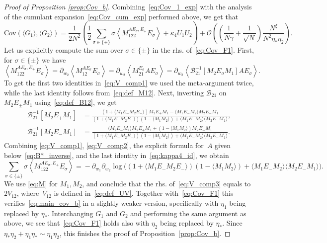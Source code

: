 \documentclass[10pt]{amsart}
\numberwithin{equation}{section}
\newcommand{\Cov}{\mathrm{Cov}}
\begin{document}
\begin{proof}[Proof of Proposition \ref{prop:Cov_b}]
Combining~\eqref{eq:Cov_1_exp} with the analysis of the cumulant expansion~\eqref{eq:Cov_cum_exp} performed above, we get that
\begin{equation}
\Cov\left(\langle G_1\rangle,\langle G_2\rangle\right) = \frac{1}{2N^2}\left(\frac{1}{2}\sum_{\sigma\in\{\pm\}} \sigma\left\langle M_{122}^{AE_\sigma,E_+}E_\sigma\right\rangle + \kappa_4U_1U_2\right) +\mathcal{O}\left(\left(\frac{1}{N\gamma}+\frac{1}{\sqrt{N}}\right)\frac{N^\xi}{N^2\eta_*\eta_2}\right).
\label{eq:Cov_F1}
\end{equation}
Let us explicitly compute the sum over $\sigma\in\{\pm\}$ in the rhs. of~\eqref{eq:Cov_F1}. First, for $\sigma\in\{\pm\}$ we have  
\begin{equation}
\left\langle M_{122}^{AE_\sigma,E_+}E_\sigma\right\rangle = \partial_{w_2}\left\langle M_{12}^{AE_\sigma}E_\sigma\right\rangle = \partial_{w_2}\left\langle M_{21}^{E_\sigma}AE_\sigma\right\rangle = \partial_{w_2}\left\langle\mathcal{B}_{21}^{-1}[M_2E_\sigma M_1] AE_\sigma\right\rangle.
\label{eq:V_comp1}
\end{equation}
To get the first two identities in~\eqref{eq:V_comp1} we used the meta-argument twice, while the last identity follows from~\eqref{eq:def_M12}. Next, inverting $\mathcal{B}_{21}$ on $M_2E_\pm M_1$ using~\eqref{eq:def_B12}, we get
\begin{equation}
\begin{split}
\mathcal{B}_{21}^{-1}[M_2E_+M_1] &= \frac{(1+\langle M_1E_-M_2E_-\rangle)M_2E_+M_1 -\langle M_1E_-M_2\rangle M_2E_-M_1}{(1+\langle M_1E_-M_2E_-\rangle)(1-\langle M_1M_2\rangle) + \langle M_1E_-M_2\rangle\langle M_2E_-M_1\rangle},\\
\mathcal{B}_{21}^{-1}[M_2E_-M_1] &= \frac{\langle M_2E_-M_1\rangle M_2E_+M_1 +(1-\langle M_1M_2\rangle) M_2E_-M_1}{(1+\langle M_1E_-M_2E_-\rangle)(1-\langle M_1M_2\rangle) + \langle M_1E_-M_2\rangle\langle M_2E_-M_1\rangle}.
\end{split}
\label{eq:V_comp2}
\end{equation}
Combining \eqref{eq:V_comp1}, \eqref{eq:V_comp2}, the explicit formula for~$A$ given below~\eqref{eq:B*_inverse}, and the last identity in~\eqref{eq:kappa4_id}, we obtain
\begin{equation}
\sum_{\sigma\in\{\pm\}}\!\! \sigma\left\langle M_{122}^{AE_\sigma,E_+}E_\sigma\right\rangle\! = \!- \partial_{w_1}\partial_{w_2}\log \Big((1+\langle M_1E_-M_2E_-\rangle)(1-\langle M_1M_2\rangle) \!+ \!\langle M_1E_-M_2\rangle\langle M_2E_-M_1\rangle\Big).
\label{eq:V_comp3}
\end{equation}
We use \eqref{eq:M} for $M_1,M_2$, and conclude that the rhs. of~\eqref{eq:V_comp3} equals to $2V_{12}$, where~$V_{12}$ is defined in~\eqref{eq:def_UV}. Together with~\eqref{eq:Cov_F1} this verifies~\eqref{eq:main_cov_b} in a slightly weaker version, specifically with $\eta_1$ being replaced by $\eta_*$. Interchanging $G_1$ and $G_2$ and performing the same argument as above, we see that~\eqref{eq:Cov_F1} holds also with $\eta_2$ being replaced by $\eta_*$. Since $\eta_*\eta_2+\eta_1\eta_*\sim \eta_1\eta_2$, this finishes the proof of Proposition~\ref{prop:Cov_b}. 
\end{proof}
\end{document}
